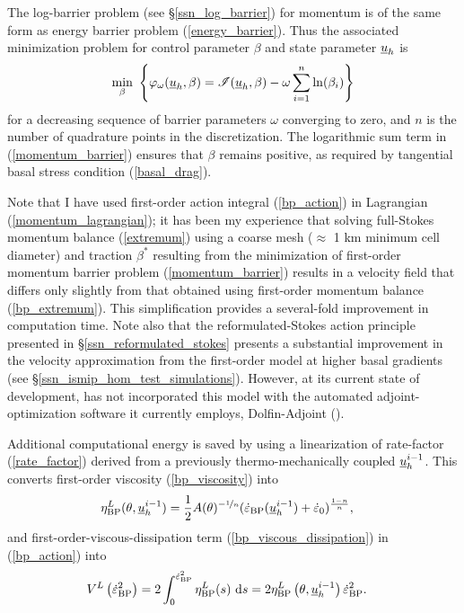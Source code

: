 The log-barrier problem  (see \S \ref{ssn_log_barrier}) for momentum is of the same form as energy barrier problem (\ref{energy_barrier}).  Thus the associated minimization problem for  control parameter $\beta$ and  state parameter $\underline{u}_h$ is
\begin{align}
  \min_{\beta}\ \left\{ \varphi_{\omega}(\underline{u}_h, \beta) = \mathscr{I}(\underline{u}_h, \beta) - \omega \sum_{i=1}^n \ln(\beta_i) \right\}
\label{momentum_barrier}
\end{align}
for a decreasing sequence of barrier parameters $\omega$ converging to zero, and $n$ is the number of quadrature points in the discretization.  The logarithmic sum term in (\ref{momentum_barrier}) ensures that $\beta$ remains positive, as required by tangential basal stress condition (\ref{basal_drag}).
  
Note that I have used first-order action integral (\ref{bp_action}) in Lagrangian (\ref{momentum_lagrangian}); it has been my experience that solving full-Stokes momentum balance (\ref{extremum}) using a coarse mesh ($\approx$ 1 km minimum cell diameter) and traction $\beta^*$ resulting from the minimization of first-order momentum barrier problem (\ref{momentum_barrier}) results in a velocity field that differs only slightly from that obtained using first-order momentum balance (\ref{bp_extremum}).  This simplification provides a several-fold improvement in computation time.  Note also that the reformulated-Stokes action principle presented in \S \ref{ssn_reformulated_stokes} presents a substantial improvement in the velocity approximation from the first-order model at higher basal gradients (see \S \ref{ssn_ismip_hom_test_simulations}).  However, at its current state of development, \CSLVR has not incorporated this model with the automated adjoint-optimization software it currently employs, Dolfin-Adjoint (\citet{farrell_2013}).
  
Additional computational energy is saved by using a linearization of rate-factor (\ref{rate_factor}) derived from a previously thermo-mechanically coupled $\underline{u}_h^{i-1}$.  This converts first-order viscosity (\ref{bp_viscosity}) into
\begin{align}
  \label{linear_bp_viscosity}
  \eta_{\text{BP}}^L(\theta, \underline{u}_h^{i-1}) &= \frac{1}{2}A(\theta)^{-\nicefrac{1}{n}} (\dot{\varepsilon}_{\text{BP}}(\underline{u}_h^{i-1}) + \dot{\varepsilon}_0)^{\frac{1-n}{n}},
\end{align} 
and first-order-viscous-dissipation term (\ref{bp_viscous_dissipation}) in (\ref{bp_action}) into 
\begin{align}
  \label{linear_viscous_dissipation}
  V^L\left( \dot{\varepsilon}_{\text{BP}}^2 \right) &= 2 \int_0^{\dot{\varepsilon}_{\text{BP}}^2} \eta_{\text{BP}}^L(s) \ \mathrm{d}s 
  = 2 \eta_{\text{BP}}^L\left(\theta, \underline{u}_h^{i-1} \right) \dot{\varepsilon}_{\text{BP}}^2.
\end{align}
  
